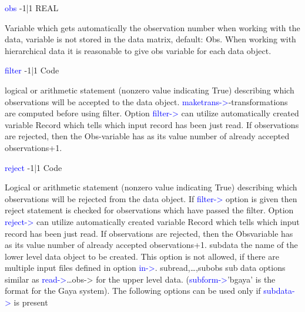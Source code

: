 \noindent \textcolor{blue}{obs} \tabto{3cm} -1|1 \tabto{5cm}  REAL \tabto{7cm}
\begin{changemargin}{3cm}{0cm}
\noindent  Variable which gets automatically the observation number when working with the
data, variable is not stored in the data matrix, default: Obs. When working with
hierarchical data it is reasonable to give obs variable for each data object.
\end{changemargin}
\vspace{0.3cm}
\hline
\vspace{0.3cm}
\noindent \textcolor{blue}{filter} \tabto{3cm} -1|1 \tabto{5cm}  Code \tabto{7cm}
\begin{changemargin}{3cm}{0cm}
\noindent  logical or arithmetic statement (nonzero value indicating True) describing which
observations will be accepted to the data object. \textcolor{blue}{maketrans->}-transformations are
computed before using filter. Option \textcolor{blue}{filter->} can utilize automatically created
variable Record which tells which input record has been just read. If observations
are rejected, then the Obs-variable has as its value number of already accepted
observations+1.
\end{changemargin}
\vspace{0.3cm}
\hline
\vspace{0.3cm}
\noindent \textcolor{blue}{reject}  \tabto{3cm} -1|1 \tabto{5cm}  Code \tabto{7cm}
\begin{changemargin}{3cm}{0cm}
\noindent  Logical or arithmetic statement (nonzero value indicating True) describing which
observations will be rejected from the data object. If \textcolor{blue}{filter->} option is given then
reject statement is checked for observations which have passed the filter. Option
\textcolor{blue}{reject->} can utilize automatically created variable Record which tells which
input record has been just read. If observations are rejected, then the Obsvariable has as its value number of already accepted observations+1.
subdata the name of the lower level data object to be created. This option is not allowed, if
there are multiple input files defined in option \textcolor{blue}{in->}.
subread,…,subobs sub data options similar as \textcolor{blue}{read->}…obs-> for the upper level data.
(\textcolor{blue}{subform->}'bgaya' is the format for the Gaya system). The following options
can be used only if \textcolor{blue}{subdata->} is present
\end{changemargin}
\vspace{0.3cm}
\hline
\vspace{0.3cm}
